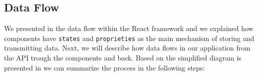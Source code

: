 \subsection{Data Flow}
\label{sub-sec:data-flow}

We presented in  the data flow within the React framework and we explained how components have \texttt{states} and \texttt{proprieties} as the main mechanism of storing and transmitting data. Next, we will describe how data flows in our application from the API trough the components and back. Based on the simplified diagram is presented in  we can summarize the process in the following steps:


